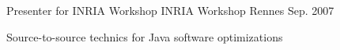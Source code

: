 \begin{cventries}
  \cventry
    {Presenter for INRIA Workshop} %
    {INRIA Workshop} %
    {Rennes} %
    {Sep. 2007} %
    {
      \begin{cvitems} %
        \item {Source-to-source technics for Java software optimizations}
      \end{cvitems}
    }

\end{cventries}
